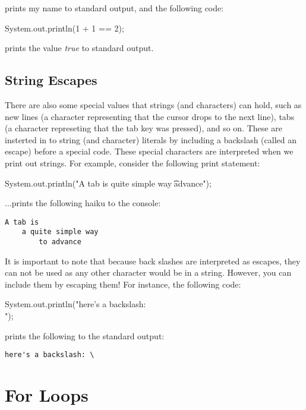 prints my name to standard output, and the following code:

\begin{code}
System.out.println(1 + 1 == 2);
\end{code}

prints the value \textit{true} to standard output.  


\subsection{String Escapes}


There are also some special values that strings (and characters) can hold, such as new lines (a character representing that the cursor drops to the next line), tabs (a character represeting that the tab key was pressed), and so on. These are insterted in to string (and character) literals by including a backslash (called an escape) before a special code. These special characters are interpreted when we print out strings. For example, consider the following print statement:

\begin{code}
System.out.println("A tab is \n\ta quite simple way \n\t\tto advance");
\end{code}

...prints the following haiku to the console:

\begin{verbatim}
A tab is
	a quite simple way
		to advance
\end{verbatim}

It is important to note that because back slashes are interpreted as escapes, they can not be used as any other character would be in a string. However, you can include them by escaping them! For instance, the following code:

\begin{code}
System.out.println("here's a backslash: \\");
\end{code}

prints the following to the standard output:

\begin{verbatim}
here's a backslash: \
\end{verbatim}


\section{For Loops}

